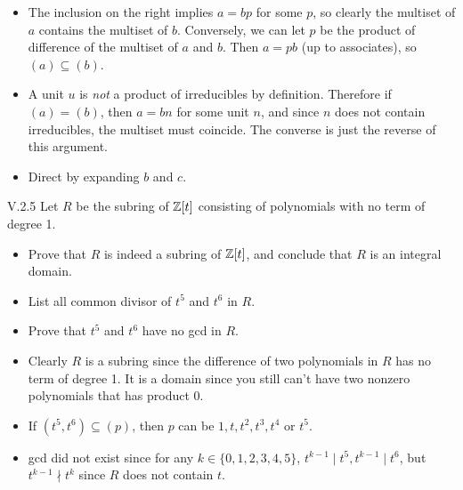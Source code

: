 \begin{pf}
\begin{itemize}	
    \setlength\itemsep{0pt}
    \item The inclusion on the right implies $a = bp$ for some $p$, so clearly the multiset of $a$ contains the multiset of $b$. Conversely, we can let $p$ be the product of difference of the multiset of $a$ and $b$. Then $a = pb$ (up to associates), so $(a)\subseteq(b)$.
    \item A unit $u$ is \emph{not} a product of irreducibles by definition. Therefore if $(a) = (b)$, then $a = bn$ for some unit $n$, and since $n$ does not contain irreducibles, the multiset must coincide. The converse is just the reverse of this argument.
    \item Direct by expanding $b$ and $c$.
\end{itemize}
\end{pf}

\begin{problem}{V.2.5}
Let $R$ be the subring of $\mathbb{Z}[t]$ consisting of polynomials with no term of degree 1.
\begin{itemize}
    \setlength\itemsep{0pt}
    \item Prove that $R$ is indeed a subring of $\mathbb{Z}[t]$, and conclude that $R$ is an integral domain.
    \item List all common divisor of $t^5$ and $t^6$ in $R$.
    \item Prove that $t^5$ and $t^6$ have no gcd in $R$.
\end{itemize}
\end{problem}
\begin{pf}
\begin{itemize}
    \setlength\itemsep{0pt}
    \item Clearly $R$ is a subring since the difference of two polynomials in $R$ has no term of degree 1. It is a domain since you still can't have two nonzero polynomials that has product $0$.
    \item If $(t^5, t^6) \subseteq (p)$, then $p$ can be $1, t, t^2, t^3, t^4$ or $t^5$.
    \item gcd did not exist since for any $k \in \{0,1,2,3,4,5\}$, $t^{k-1} \mid t^5, t^{k-1} \mid t^6$, but $t^{k-1} \nmid t^k$ since $R$ does not contain $t$.
\end{itemize}
\end{pf}
